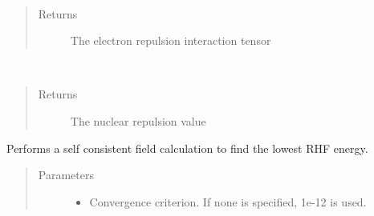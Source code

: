 \documentclass[letterpaper,10pt,english]{sphinxmanual}
\begin{document}
\begin{fulllineitems}
\begin{fulllineitems}
\begin{quote}
\begin{description}
\end{description}\end{quote}

\end{fulllineitems}


\begin{fulllineitems}
\label{\detokenize{RHF:hf.HartreeFock.RHF.MF.get_two_e}}~\begin{quote}\begin{description}
\item[{Returns}] \leavevmode
The electron repulsion interaction tensor

\end{description}\end{quote}

\end{fulllineitems}


\begin{fulllineitems}
\label{\detokenize{RHF:hf.HartreeFock.RHF.MF.nuc_rep}}~\begin{quote}\begin{description}
\item[{Returns}] \leavevmode
The nuclear repulsion value

\end{description}\end{quote}

\end{fulllineitems}


\begin{fulllineitems}
\label{\detokenize{RHF:hf.HartreeFock.RHF.MF.scf}}
Performs a self consistent field calculation to find the lowest RHF energy.
\begin{quote}\begin{description}
\item[{Parameters}] \leavevmode\begin{itemize}
\item {} 
 \textendash{} Convergence criterion. If none is specified, 1e-12 is used.


\end{itemize}
\end{description}
\end{quote}
\end{fulllineitems}
\end{fulllineitems}
\end{document}
